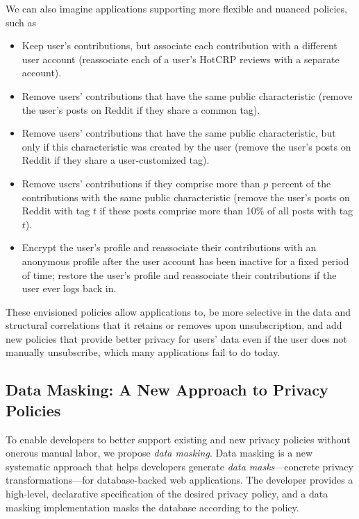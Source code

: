 We can also imagine applications supporting more flexible and nuanced policies, such as
\begin{itemize}
    \item Keep user's contributions, but associate each contribution with a different user account
        (\eg reassociate each of a user's HotCRP reviews with a separate account).
    \item Remove users' contributions that have the same public characteristic (\eg remove the user's
       posts on Reddit if they share a common tag).
    \item Remove users' contributions that have the same public characteristic, but only if this
        characteristic was created by the user (\eg remove the user's posts on Reddit if they share
        a user-customized tag).  
    \item Remove users' contributions if they comprise more than $p$
            percent of the contributions with the same public characteristic (\eg remove the user's
            posts on Reddit with tag $t$ if these posts comprise more than 10\% of all posts with
            tag $t$).
    \item Encrypt the user's profile and reassociate their contributions with an anonymous
        profile after the user account has been inactive for a fixed period of time;
        restore the user's profile and reassociate their contributions if the user ever logs back in.
\end{itemize}
These envisioned policies allow applications to, \eg be more selective in the data and structural
correlations that it retains or removes upon unsubscription, and add new policies that provide
better privacy for users' data even if the user does not manually unsubscribe, which many applications 
fail to do today.

\subsection{Data Masking: A New Approach to Privacy Policies}
To enable developers to better support existing and new privacy policies without onerous manual
labor, we propose \emph{data masking}.
%
Data masking is a new systematic approach that helps developers generate
\emph{data masks}---concrete privacy transformations---for database-backed web applications. The
developer provides a high-level, declarative specification of the desired privacy policy, and a data
masking implementation masks the database according to the policy.

